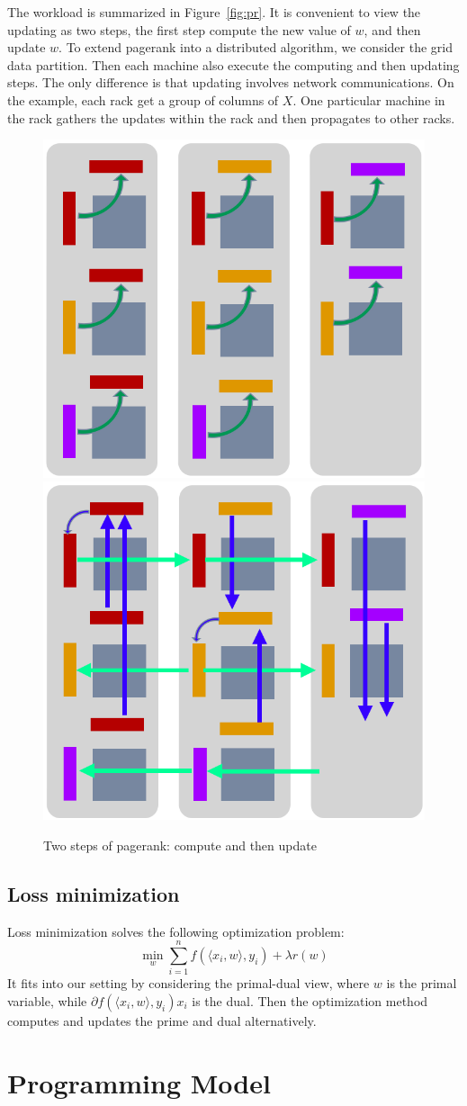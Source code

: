 \documentclass{acm_proc_article-sp}
\begin{document}
The workload is summarized in Figure~\ref{fig:pr}. It is convenient to view the
updating as two steps, the
first step compute the new value of $w$, and then update $w$. To extend pagerank
into a distributed algorithm, we consider the grid data partition. Then each
machine also execute the computing and then updating steps. The only difference
is that updating involves network communications. On the example, each rack get
a group of columns of $X$. One particular  machine in the rack gathers the
updates within the rack and then propagates to other racks.

\begin{figure}[th!]
  \centering
  \includegraphics[width=.25\textwidth]{fig/compute}
  \includegraphics[width=.25\textwidth]{fig/update}
  \caption{Two steps of pagerank: compute and then update}
\end{figure}

\subsection{Loss minimization}

Loss minimization solves the following optimization problem:
\begin{equation}
  \min_w \sum_{i=1}^{n} f(\langle x_i, w\rangle, y_i) + \lambda r(w)
\end{equation}
It fits into our setting by considering the primal-dual view, where $w$ is the primal
variable, while $\partial f(\langle x_i, w\rangle, y_i) x_i$ is the dual. Then
the optimization method computes and updates the prime and dual alternatively.

\section{Programming Model}
\end{document}
